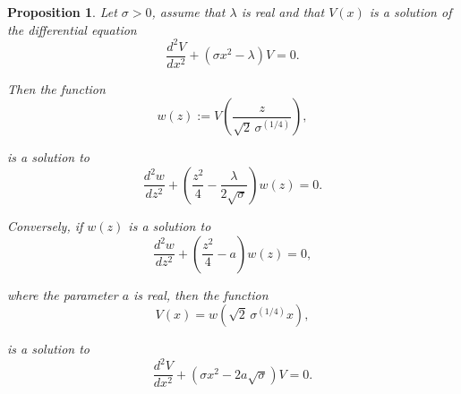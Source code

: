 \documentclass[10pt,a4paper]{amsart}
\newtheorem{proposition}{Proposition}
\begin{document}
\begin{proposition}
Let $\sigma>0$, assume that $\lambda$ is real and that $V(x)$ is a solution of the differential equation
\begin{equation}
\frac{d^2 V}{dx^2}+ (\sigma x^2 - \lambda)V=0.\label{1}
\end{equation}

Then the function 
\begin{equation}
w(z):=V\left(\frac{z}{\sqrt{2}\,\sigma^{(1/4)}}\right),\label{2}
\end{equation}

is a solution to
\begin{equation}
\frac{d^2 w}{dz^2}+\left(\frac{z^2}{4}-\frac{\lambda}{2\sqrt{\sigma}}\right)\!w(z)=0.\label{3}
\end{equation}

Conversely, if $w(z)$ is a solution to
\begin{equation}
\frac{d^2 w}{dz^2}+\left(\frac{z^2}{4}-a\right)w(z)=0,\label{4}
\end{equation}

where the parameter $a$ is real, then the function
\begin{equation}
V(x)=w(\sqrt{2}\,\sigma^{(1/4)}x),\label{5}
\end{equation}

is a solution to
\begin{equation}
\frac{d^2 V}{dx^2}+ (\sigma x^2 - 2a\sqrt{\sigma})V=0.\label{6}
\end{equation}
\end{proposition}
\end{document}
